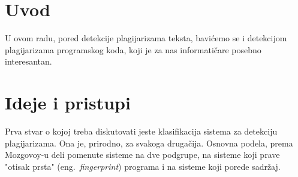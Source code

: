 \documentclass[a4paper]{article}
\begin{document}
\section{Uvod}
\label{sec:uvod}

U ovom radu, pored detekcije plagijarizama teksta, bavićemo se i  detekcijom plagijarizama programskog koda, koji je za nas informatičare posebno interesantan.

\section{Ideje i pristupi}
\label{sec:ideje i pristupi}

Prva stvar o kojoj treba diskutovati jeste klasifikacija sistema za detekciju plagijarizama. Ona je, prirodno, za svakoga drugačija. Osnovna podela, prema Mozgovoy-u deli pomenute sisteme na dve podgrupe, na sisteme koji prave "otisak prsta" (eng.~{\em fingerprint}) programa i na sisteme koji porede sadržaj.

\end{document}
